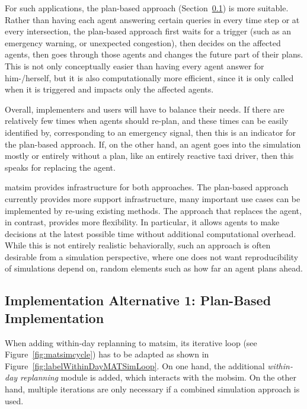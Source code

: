 For such applications, the plan-based approach (Section~\ref{sec:impl-plan-based}) is more suitable. Rather than having each agent answering certain queries in every time step or at every intersection, the plan-based approach first waits for a trigger (such as an emergency warning, or unexpected congestion), then decides on the affected agents,  then goes through those agents and changes the future part of their plans. This is not only conceptually easier than having every agent answer for him-/herself, but it is also computationally more efficient, since it is only called when it is triggered and impacts only the affected agents. 

Overall, implementers and users will have to balance their needs.  
%
If there are relatively few times when agents should re-plan, and these times can be easily identified by, \ie corresponding to an emergency signal, then this is an indicator for the plan-based approach.  
%
If, on the other hand, an agent goes into the simulation mostly or entirely without a plan, like an entirely reactive taxi driver, then this speaks for replacing the agent.

\gls{matsim} provides infrastructure for both approaches. The plan-based approach currently provides more support infrastructure, \ie many important use cases can be implemented by re-using existing methods. The approach that replaces the agent, in contrast, provides more flexibility. In particular, it allows agents to make decisions at the latest possible time without additional computational overhead.  While this is not entirely realistic behaviorally, such an approach is often desirable from a simulation perspective, where one does not want reproducibility of simulations depend on, \eg random elements such as how far an agent plans ahead.

\subsection{Implementation Alternative 1: Plan-Based Implementation}
\label{sec:impl-plan-based}
%

When adding within-day replanning to \gls{matsim}, its iterative loop (see Figure~\ref{fig:matsimcycle}) has to be adapted as shown in Figure~\ref{fig:labelWithinDayMATSimLoop}. On one hand, the additional \emph{within-day replanning} module is added, which interacts with the \gls{mobsim}. On the other hand, multiple iterations are only necessary if a combined simulation approach is used.
%

